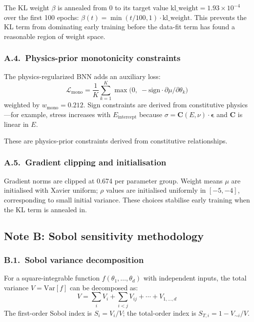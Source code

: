 \documentclass[11pt,a4paper]{article}
\newcommand{\Eint}{\ensuremath{E_{\mathrm{intercept}}}}
\begin{document}
The KL weight $\beta$ is annealed from 0 to its target value
$\mathrm{kl\_weight} = 1.93\times10^{-4}$ over the first 100 epochs:
$\beta(t) = \min(t/100, 1) \cdot \mathrm{kl\_weight}$.
This prevents the KL term from dominating early training before the
data-fit term has found a reasonable region of weight space.

\subsubsection*{A.4.~Physics-prior monotonicity constraints}

The physics-regularized BNN adds an auxiliary loss:
\begin{equation}
\mathcal{L}_\mathrm{mono}
= \frac{1}{K}\sum_{k=1}^{K}\max\bigl(0,\;
  -\mathrm{sign}\cdot\partial\mu/\partial\theta_k\bigr)
\end{equation}
weighted by $w_\mathrm{mono} = 0.212$. Sign constraints are derived
from constitutive physics---for example, stress increases with \Eint{}
because $\sigma = \mathbf{C}(E, \nu) \cdot \boldsymbol{\epsilon}$ and
$\mathbf{C}$ is linear in $E$.

These are physics-prior constraints derived from constitutive
relationships.

\subsubsection*{A.5.~Gradient clipping and initialisation}

Gradient norms are clipped at 0.674 per parameter group. Weight means
$\mu$ are initialised with Xavier uniform; $\rho$ values are initialised
uniformly in $[-5, -4]$, corresponding to small initial variance. These
choices stabilise early training when the KL term is annealed in.


\subsection{Note B: Sobol sensitivity methodology}

\subsubsection*{B.1.~Sobol variance decomposition}

For a square-integrable function $f(\theta_1, \ldots, \theta_d)$ with
independent inputs, the total variance $V = \mathrm{Var}[f]$ can be
decomposed as:
\begin{equation}
V = \sum_i V_i + \sum_{i<j} V_{ij} + \cdots + V_{1,\ldots,d}
\end{equation}
The first-order Sobol index is $S_i = V_i / V$; the total-order index
is $S_{T,i} = 1 - V_{\sim i} / V$.
\end{document}
